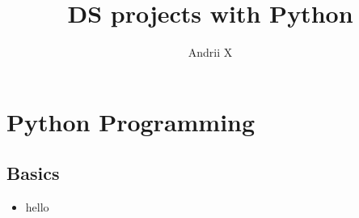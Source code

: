 \documentclass[20pt]{article}
\title{DS projects with Python}
\author{Andrii X}
\begin{document}
\maketitle


	\section{Python Programming}
	\subsection{Basics}
	\begin{itemize}
		\item hello
	\end{itemize}
\end{document}
